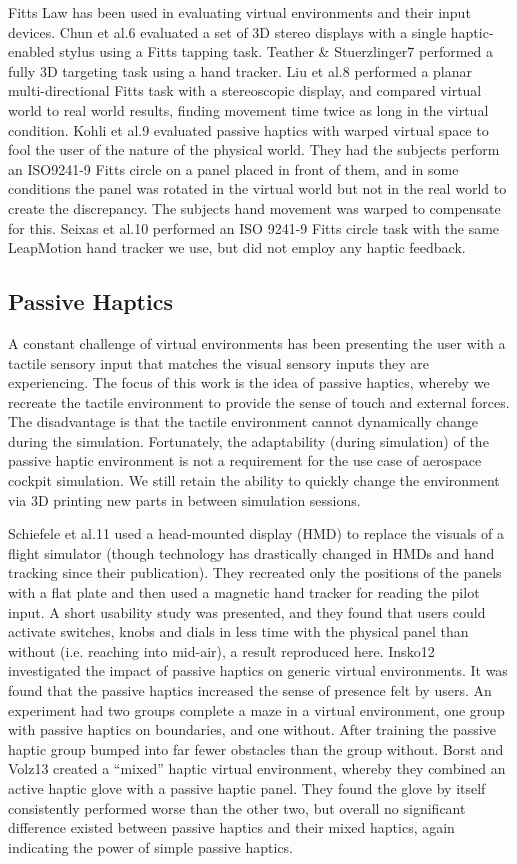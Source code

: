 \documentclass[]{aiaa-tc}%
\begin{document}
Fitts Law has been used in evaluating virtual environments and their input devices.
Chun et al.6 evaluated a set of 3D stereo displays with a single haptic-enabled stylus using a Fitts tapping task.
Teather \& Stuerzlinger7 performed a fully 3D targeting task using a hand tracker.
Liu et al.8 performed a planar multi-directional Fitts task with a stereoscopic display, and compared virtual world to real world results, finding movement time twice as long in the virtual condition.
Kohli et al.9 evaluated passive haptics with warped virtual space to fool the user of the nature of the physical world.
They had the subjects perform an ISO9241-9 Fitts circle on a panel placed in front of them, and in some conditions the panel was rotated in the virtual world but not in the real world to create the discrepancy.
The subjects hand movement was warped to compensate for this.
Seixas et al.10 performed an ISO 9241-9 Fitts circle task with the same LeapMotion hand tracker we use, but did not employ any haptic feedback.

\subsection{Passive Haptics}
A constant challenge of virtual environments has been presenting the user with a tactile sensory input that matches the visual sensory inputs they are experiencing.
The focus of this work is the idea of passive haptics, whereby we recreate the tactile environment to provide the sense of touch and external forces.
The disadvantage is that the tactile environment cannot dynamically change during the simulation.
Fortunately, the adaptability (during simulation) of the passive haptic environment is not a requirement for the use case of aerospace cockpit simulation.
We still retain the ability to quickly change the environment via 3D printing new parts in between simulation sessions.

Schiefele et al.11 used a head-mounted display (HMD) to replace the visuals of a flight simulator (though technology has drastically changed in HMDs and hand tracking since their publication).
They recreated only the positions of the panels with a flat plate and then used a magnetic hand tracker for reading the pilot input.
A short usability study was presented, and they found that users could activate switches, knobs and dials in less time with the physical panel than without (i.e. reaching into mid-air), a result reproduced here.
Insko12 investigated the impact of passive haptics on generic virtual environments.
It was found that the passive haptics increased the sense of presence felt by users.
An experiment had two groups complete a maze in a virtual environment, one group with passive haptics on boundaries, and one without.
After training the passive haptic group bumped into far fewer obstacles than the group without.
Borst and Volz13 created a ``mixed'' haptic virtual environment, whereby they combined an active haptic glove with a passive haptic panel.
They found the glove by itself consistently performed worse than the other two, but overall no significant difference existed between passive haptics and their mixed haptics, again indicating the power of simple passive haptics.
\end{document}
